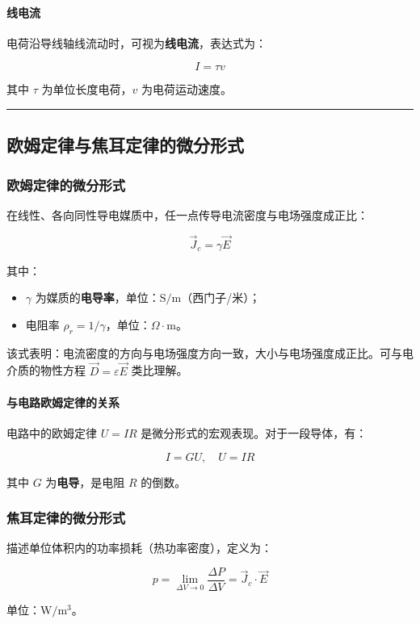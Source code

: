 \paragraph{线电流}
电荷沿导线轴线流动时，可视为\textbf{线电流}，表达式为：
\begin{formulaBox}
\[
I = \tau v
\]
\end{formulaBox}
其中 $\tau$ 为单位长度电荷，$v$ 为电荷运动速度。

\vspace{0.8cm}\hrule\vspace{0.8cm}

\subsection{欧姆定律与焦耳定律的微分形式}
\subsubsection{欧姆定律的微分形式}
在线性、各向同性导电媒质中，任一点传导电流密度与电场强度成正比：
\begin{formulaBox}
\[
\vec{J}_c = \gamma \vec{E}
\]
\end{formulaBox}
其中：
\begin{itemize}
    \item $\gamma$ 为媒质的\textbf{电导率}，单位：$\mathrm{S/m}$（西门子/米）；
    \item 电阻率 $\rho_r = 1/\gamma$，单位：$\Omega \cdot \mathrm{m}$。
\end{itemize}

\noindent 该式表明：电流密度的方向与电场强度方向一致，大小与电场强度成正比。可与电介质的物性方程 $\vec{D} = \varepsilon \vec{E}$ 类比理解。

\paragraph{与电路欧姆定律的关系}
电路中的欧姆定律 $U=IR$ 是微分形式的宏观表现。对于一段导体，有：
\begin{formulaBox}
\[
I = GU, \quad U = IR
\]
\end{formulaBox}
其中 $G$ 为\textbf{电导}，是电阻 $R$ 的倒数。

\subsubsection{焦耳定律的微分形式}
描述单位体积内的功率损耗（热功率密度），定义为：
\begin{formulaBox}
\[
p = \lim_{\Delta V \to 0} \frac{\Delta P}{\Delta V} = \vec{J}_c \cdot \vec{E}
\]
\end{formulaBox}
单位：$\mathrm{W/m^3}$。

